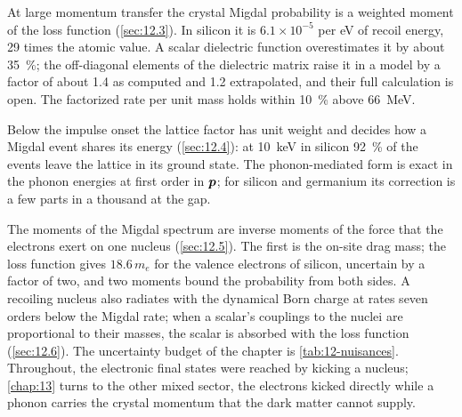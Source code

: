 At large momentum transfer the crystal Migdal probability is a weighted moment of the loss function (\cref{sec:12.3}). In silicon it is $6.1\times10^{-5}$ per eV of recoil energy, 29 times the atomic value. A scalar dielectric function overestimates it by about \SI{35}{\percent}; the off-diagonal elements of the dielectric matrix raise it in a model by a factor of about 1.4 as computed and 1.2 extrapolated, and their full calculation is open. The factorized rate per unit mass holds within \SI{10}{\percent} above \SI{66}{MeV}.

Below the impulse onset the lattice factor has unit weight and decides how a Migdal event shares its energy (\cref{sec:12.4}): at \SI{10}{keV} in silicon \SI{92}{\percent} of the events leave the lattice in its ground state. The phonon-mediated form is exact in the phonon energies at first order in $\bm{p}$; for silicon and germanium its correction is a few parts in a thousand at the gap.

The moments of the Migdal spectrum are inverse moments of the force that the electrons exert on one nucleus (\cref{sec:12.5}). The first is the on-site drag mass; the loss function gives $18.6\,m_e$ for the valence electrons of silicon, uncertain by a factor of two, and two moments bound the probability from both sides. A recoiling nucleus also radiates with the dynamical Born charge at rates seven orders below the Migdal rate; when a scalar's couplings to the nuclei are proportional to their masses, the scalar is absorbed with the loss function (\cref{sec:12.6}). The uncertainty budget of the chapter is \cref{tab:12-nuisances}. Throughout, the electronic final states were reached by kicking a nucleus; \cref{chap:13} turns to the other mixed sector, the electrons kicked directly while a phonon carries the crystal momentum that the dark matter cannot supply.
